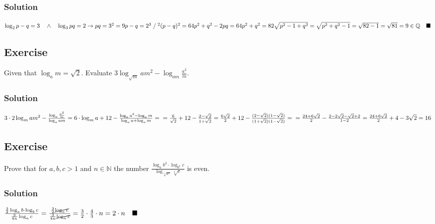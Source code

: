 \documentclass{article}
\begin{document}
\subsubsection*{Solution}
$
  \log_{2}{p-q} = 3 \quad \land \quad \log_{3}{pq} = 2 \rightarrow pq = 3^2 = 9 \\
  p-q = 2^3 \; / \; ^2 \\
  (p-q){^2} = 64 \\
  p^2 + q^2 - 2pq = 64 \\
  p^2 + q^2 = 82 \\
  \\
  \sqrt{p^2 - 1 + q^2} = \sqrt{p^2 + q^2 - 1} = \sqrt{82 - 1} = \sqrt{81} = 9 \in \mathbb{Q} \quad \blacksquare
$
\subsection{Exercise}
Given that $\log_a{m} = \sqrt{2}$. Evaluate $3\log_{\sqrt{m}}{am^2} - \log_{am}{\frac{a^2}{m}}$.
\subsubsection*{Solution}
$
  3 \cdot 2 \log_{m}{am^2} - \frac{\log_a{\frac{a^2}{m}}}{\log_a{am}} = 6 \cdot \log_m{a} + 12 - \frac{\log_a{a^2} - \log_a{m}}{\log_a{a} + \log_a{m}} = \\
   = \frac{6}{\sqrt{2}} + 12 - \frac{2 - \sqrt{2}}{1 + \sqrt{2}} = \frac{6\sqrt{2}}{2} + 12 - \frac{(2 - \sqrt{2})(1 - \sqrt{2})}{(1 + \sqrt{2})(1 - \sqrt{2})} = \\
   = \frac{24 + 6\sqrt{2}}{2} - \frac{2 - 2\sqrt{2} - \sqrt{2} + 2}{1 - 2} = \frac{24 + 6\sqrt{2}}{2} + 4 - 3\sqrt{2} = 16
$
\subsection{Exercise}
Prove that for $a, b, c > 1$ and $n \in \mathbb{N}$ the number $\frac{\log_a{b^3} \cdot \log_{b^2}{c}}{\log_{\sqrt[3]{a^n}}{\sqrt[4]{c}}}$ is even.
\subsubsection*{Solution}
$
 \frac{\frac{3}{2} \log_a{b} \cdot \log_b{c}}{\frac{3}{4n} \log_a{c}} = \frac{\frac{3}{2} \cancel{\log_a{c}}}{\frac{3}{4n} \cancel{\log_a{c}}} = \frac{3}{2} \cdot \frac{4}{3} \cdot n = 2 \cdot n \quad \blacksquare
$
\end{document}
